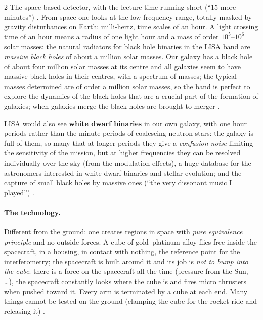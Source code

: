 \begin{paracol}{2}
The space based detector, with the lecture time running short (``15 more minutes'') . From space one looks at the low frequency range, totally masked by gravity disturbances on Earth: milli-hertz, time scales of an hour. A light crossing time of an hour means a radius of one light hour and a mass of order $10^5$--$10^6$ solar masses: the natural radiators for black hole binaries in the LISA band are \emph{massive black holes} of about a million solar masses. Our galaxy has a black hole of about four million solar masses at its centre and all galaxies seem to have massive black holes in their centres, with a spectrum of masses; the typical masses determined are of order a million solar masses, so the band is perfect to explore the dynamics of the black holes that are a crucial part of the formation of galaxies; when galaxies merge the black holes are brought to merger .

LISA would also see \textbf{white dwarf binaries} in our own galaxy, with one hour periods rather than the minute periods of coalescing neutron stars: the galaxy is full of them, so many that at longer periods they give a \emph{confusion noise} limiting the sensitivity of the mission, but at higher frequencies they can be resolved individually over the sky (from the modulation effects), a huge database for the astronomers interested in white dwarf binaries and stellar evolution; and the capture of small black holes by massive ones (``the very dissonant music I played'') .

\paragraph{The technology.} Different from the ground: one creates regions in space with \emph{pure equivalence principle} and no outside forces. A cube of gold--platinum alloy flies free inside the spacecraft, in a housing, in contact with nothing, the reference point for the interferometry; the spacecraft is built around it and its job is \emph{not to bump into the cube}: there is a force on the spacecraft all the time (pressure from the Sun, \dots), the spacecraft constantly looks where the cube is and fires micro thrusters when pushed toward it. Every arm is terminated by a cube at each end. Many things cannot be tested on the ground (clamping the cube for the rocket ride and releasing it) .


\end{paracol}
